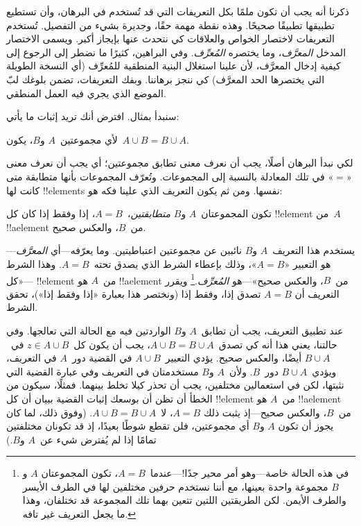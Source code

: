\documentclass[../../../include/open-logic-section]{subfiles}
\begin{document}


ذكرنا أنه يجب أن تكون ملمًا بكل التعريفات التي قد تُستخدم في البرهان،
وأن تستطيع تطبيقها تطبيقًا صحيحًا. وهذه نقطة مهمة حقًا، وجديرة بشيء
من التفصيل. تُستخدم التعريفات لاختصار الخواص والعلاقات كي نتحدث عنها
بإيجاز أكبر. ويسمى الاختصار المدخل \emph{المعرَّف}، وما يختصره
\emph{المُعرِّف}. وفي البراهين، كثيرًا ما نضطر إلى الرجوع إلى كيفية
إدخال المعرَّف، لأن علينا استغلال البنية المنطقية للمُعرِّف (أي النسخة
الطويلة التي يختصرها الحد المعرَّف) كي ننجز برهاننا. وبفك التعريفات،
تضمن بلوغك لبّ الموضع الذي يجري فيه العمل المنطقي.

سنبدأ بمثال. افترض أنك تريد إثبات ما يأتي:

\begin{prop}
لأي مجموعتين~$A$ و$B$، يكون~$A \cup B = B \cup A$.
\end{prop}

لكي نبدأ البرهان أصلًا، يجب أن نعرف معنى تطابق مجموعتين؛ أي يجب أن
نعرف معنى «$=$» في تلك المعادلة بالنسبة إلى المجموعات. وتُعرّف
المجموعات بأنها متطابقة متى كانت لها !!{element}s نفسها. ومن ثم يكون
التعريف الذي علينا فكه هو:

\begin{defn}
تكون المجموعتان~$A$ و$B$ \emph{متطابقتين}،~$A = B$، إذا وفقط إذا كان
كل !!{element} من~$A$ !!a{element} من~$B$، والعكس صحيح.
\end{defn}

يستخدم هذا التعريف~$A$ و$B$ نائبين عن مجموعتين اعتباطيتين. وما
يعرّفه---أي \emph{المعرَّف}---هو التعبير «$A = B$»، وذلك بإعطاء الشرط
الذي يصدق تحته~$A = B$. وهذا الشرط---«كل !!{element} من~$A$ هو
!!a{element} من~$B$، والعكس صحيح»---هو \emph{المُعرِّف}.\footnote{في
هذه الحالة خاصة---وهو أمر محير جدًا!---عندما~$A = B$، تكون المجموعتان
$A$ و$B$ مجموعة واحدة بعينها، مع أننا نستخدم حرفين مختلفين لها في
الطرف الأيسر والطرف الأيمن. لكن الطريقتين اللتين تتعين بهما تلك
المجموعة قد تختلفان، وهذا ما يجعل التعريف غير تافه.} ويقرر التعريف أن
$A = B$ تصدق إذا، وفقط إذا (ونختصر هذا بعبارة «إذا وفقط إذا»)، تحقق
الشرط.

عند تطبيق التعريف، يجب أن تطابق~$A$ و$B$ الواردتين فيه مع الحالة التي
تعالجها. وفي حالتنا، يعني هذا أنه كي تصدق~$A \cup B = B \cup A$، يجب
أن يكون كل~$z \in A \cup B$ في~$B \cup A$ أيضًا، والعكس صحيح. يؤدي
التعبير~$A \cup B$ في القضية دور~$A$ في التعريف، ويؤدي~$B \cup A$
دور~$B$. ولأن~$A$ و$B$ مستخدمتان في التعريف وفي عبارة القضية التي
نثبتها، لكن في استعمالين مختلفين، يجب أن تحذر كيلا تخلط بينهما.
فمثلًا، سيكون من الخطأ أن تظن أن بوسعك إثبات القضية ببيان أن كل
!!{element} من~$A$ هو !!a{element} من~$B$، والعكس صحيح---إذ يثبت ذلك
$A = B$، لا~$A \cup B = B \cup A$. (وفوق ذلك، لما كان يجوز أن تكون
$A$ و$B$ أي مجموعتين، فلن تقطع شوطًا بعيدًا، إذ قد تكونان مختلفتين
تمامًا إذا لم يُفترض شيء عن~$A$ و$B$.)
\end{document}
